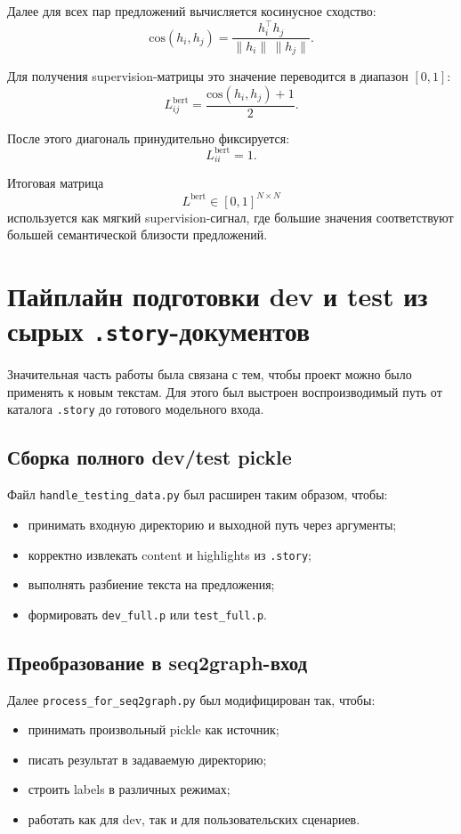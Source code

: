 \documentclass[12pt,a4paper]{article}
\begin{document}
Далее для всех пар предложений вычисляется косинусное сходство:
\[
\mathrm{cos}(h_i, h_j) = \frac{h_i^\top h_j}{\|h_i\|\,\|h_j\|}.
\]

Для получения supervision-матрицы это значение переводится в диапазон $[0,1]$:
\[
L^{\text{bert}}_{ij} = \frac{\mathrm{cos}(h_i, h_j) + 1}{2}.
\]

После этого диагональ принудительно фиксируется:
\[
L^{\text{bert}}_{ii} = 1.
\]

Итоговая матрица
\[
L^{\text{bert}} \in [0,1]^{N \times N}
\]
используется как мягкий supervision-сигнал, где большие значения соответствуют большей
семантической близости предложений.

\section{Пайплайн подготовки dev и test из сырых \texttt{.story}-документов}

Значительная часть работы была связана с тем, чтобы проект можно было применять к новым
текстам. Для этого был выстроен воспроизводимый путь от каталога \texttt{.story} до
готового модельного входа.

\subsection{Сборка полного dev/test pickle}

Файл \texttt{handle\_testing\_data.py} был расширен таким образом, чтобы:

\begin{itemize}
    \item принимать входную директорию и выходной путь через аргументы;
    \item корректно извлекать content и highlights из \texttt{.story};
    \item выполнять разбиение текста на предложения;
    \item формировать \texttt{dev\_full.p} или \texttt{test\_full.p}.
\end{itemize}

\subsection{Преобразование в seq2graph-вход}

Далее \texttt{process\_for\_seq2graph.py} был модифицирован так, чтобы:

\begin{itemize}
    \item принимать произвольный pickle как источник;
    \item писать результат в задаваемую директорию;
    \item строить labels в различных режимах;
    \item работать как для dev, так и для пользовательских сценариев.
\end{itemize}
\end{document}
